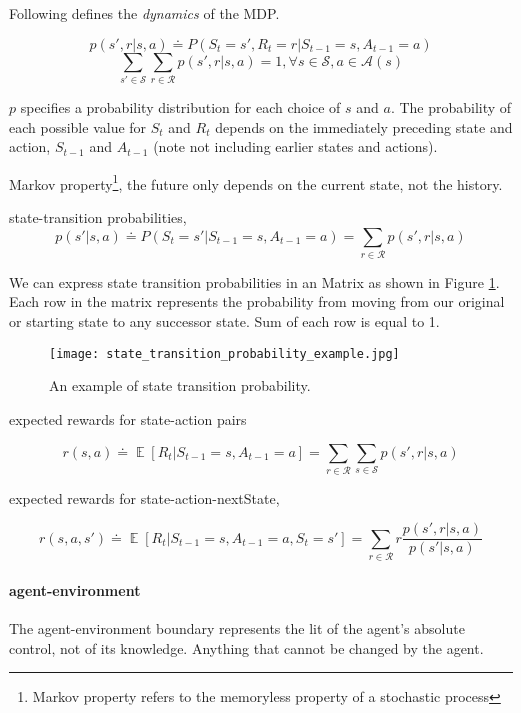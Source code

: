\documentclass[lang=en,mode=geye,device=normal,color=blue,14pt]{elegantnote}
\DeclareMathOperator*{\E}{\mathbb{E}}
\DeclareMathOperator*{\1}{\mathbbm{1}}
\begin{document}
Following defines the \textit{dynamics} of the MDP.

$$ p(s', r| s, a) \doteq P(S_t = s', R_t = r | S_{t-1} = s, A_{t-1} = a) $$
$$ \sum_{s' \in \mathcal{S}} \sum_{r \in \mathcal{R}} p(s',r|s,a) = 1, \forall s \in \mathcal{S}, a \in \mathcal{A}(s) $$

$p$ specifies a probability distribution for each choice of $s$ and $a$.
The probability of each possible value for $S_t$ and $R_t$ depends on the immediately preceding state and action, $S_{t-1}$ and $A_{t-1}$ (note not including earlier states and actions).

\begin{definition}
Markov property\footnote{Markov property refers to the memoryless property of a stochastic process}, the future only depends on the current state, not the history.
\end{definition}

\begin{definition}
state-transition probabilities,
$$ p(s'|s,a) \doteq P(S_t=s'|S_{t-1}=s, A_{t-1}=a) = \sum_{r\in \mathcal{R}} p(s',r|s,a) $$
\end{definition}
We can express state transition probabilities in an Matrix as shown in Figure \ref{fig:state-trans-prob-eg}. Each row in the matrix represents the probability from moving from our original or starting state to any successor state. Sum of each row is equal to 1.
\begin{figure}[h!]
  \texttt{[image: state\_transition\_probability\_example.jpg]}
  \caption{An example of state transition probability.}
  \label{fig:state-trans-prob-eg}
\end{figure}

\begin{definition}
expected rewards for state-action pairs

$$ r(s,a) \doteq \E [R_t | S_{t-1}=s, A_{t-1}=a] = \sum_{r\in \mathcal{R}} \sum_{s\in \mathcal{S}} p(s',r|s,a) $$
\end{definition}

\begin{definition}
expected rewards for state-action-nextState,

$$ r(s,a,s') \doteq \E [R_t | S_{t-1}=s, A_{t-1}=a, S_t=s'] = \sum_{r \in \mathcal{R}} r \frac{p(s',r|s,a)}{p(s'|s,a)} $$
\end{definition}


\paragraph{agent-environment}
The agent-environment boundary represents the lit of the agent's absolute control, not of its knowledge. Anything that cannot be changed by the agent.
\end{document}
